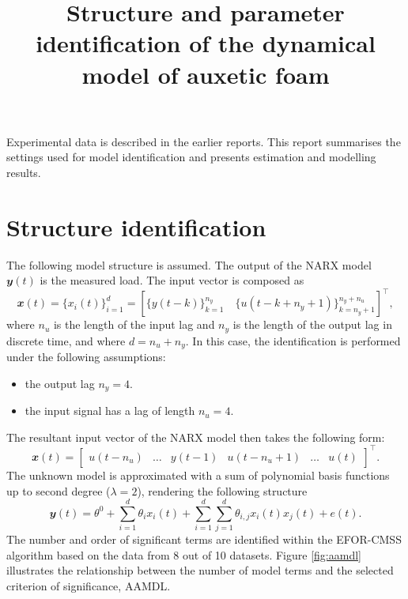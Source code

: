 \documentclass[a4paper,11pt,twoside]{article}
\title{Structure and parameter identification of the dynamical model of auxetic foam}
\def\ny{4}
\def\nu{4}
\def\order{2}
\theoremstyle{mytheoremstyle}
\begin{document}
	\maketitle
\par Experimental data is described in the earlier reports. This report summarises the settings used for model identification and presents estimation and modelling results.
\section{Structure identification}
\par The following model structure is assumed. The output of the NARX model $\mathbfit{y}(t)$ is the measured load. The input vector is composed as
\begin{equation}
	\mathbfit{x}(t) = \{x_i(t)\}^{d}_{i=1} = \left[\{y(t - k)\}^{n_y}_{k=1} \quad \{u(t - k + n_y + 1)\}^{n_y + n_u}_{k= n_y + 1} \right]^{\top},
\end{equation}
where $n_u$ is the length of the input lag and $n_y$ is the length of the output lag in discrete time, and where $d = n_u + n_y$. In this case, the identification is performed under the following assumptions:
\begin{itemize}[noitemsep,topsep=0.3pt,parsep=0.3pt,partopsep=0.2pt,labelindent=1cm] 
	\item the output lag $n_y =\ny$.
	\item the input signal has a lag of length $n_u = \nu$.
\end{itemize}
The resultant input vector of the NARX model then takes the following form:
\begin{equation}
\mathbfit{x}(t) = \left[\begin{array}{cccccc}
u(t-n_u) & \dots & y(t-1) & u(t-n_u+1) & \dots & u(t)
\end{array}\right]^{\top}.
\end{equation}
The unknown model is approximated with a sum of polynomial basis functions up to second degree ($\lambda = \order$), rendering the following structure
\begin{equation}\label{eq:narx}
	\mathbfit{y}(t) = \theta^0 + \sum_{i=1}^{d} \theta_i x_i(t) + \sum_{i=1}^{d} \sum_{j=1}^{d} \theta_{i,j} x_i(t) x_j(t) + e(t).
\end{equation}
The number and order of significant terms are identified within the EFOR-CMSS algorithm based on the data from 8 out of 10 datasets. Figure \ref{fig:aamdl} illustrates the relationship between the number of model terms and the selected criterion of significance, AAMDL.
\end{document}
